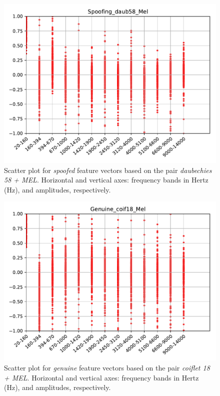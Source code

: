 		\begin{figure}[H]
			\centering
			\includegraphics[scale=.7]{images/results/barkVersusMel/Spoofing_daub58_Mel.pdf}
			\caption{Scatter plot for \textit{spoofed} feature vectors  based on the pair \textit{daubechies 58 + MEL}. Horizontal and vertical axes: frequency bands in Hertz (Hz), and amplitudes, respectively.}
			\label{fig:spoofingdaub58mel}
		\end{figure}	
		\begin{figure}[H]
			\centering
			\includegraphics[scale=.7]{images/results/barkVersusMel/Genuine_coif18_Mel.pdf}
			\caption{Scatter plot for \textit{genuine} feature vectors  based on the pair \textit{coiflet 18 + MEL}. Horizontal and vertical axes: frequency bands in Hertz (Hz), and amplitudes, respectively.}
			\label{fig:livecoif18mel}
		\end{figure}

